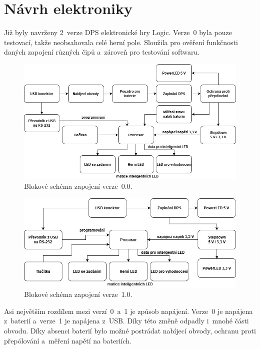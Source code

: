 \chapter{Návrh elektroniky}

Již byly navrženy 2~verze DPS elektronické hry Logic. Verze~0 byla pouze testovací, takže neobsahovala celé herní pole. 
Sloužila pro ověření funkčnosti daných zapojení různých čipů a~zároveň pro testování softwaru.

\begin{figure}[!h]
  \begin{center}
    \includegraphics[scale=0.5]{obrazky/v0_blokove_schema.jpg}
  \end{center}
  \caption[Blokové schéma zapojení verze~0.0]{Blokové schéma zapojení verze~0.0.}
\end{figure}

\begin{figure}[!h]
  \begin{center}
    \includegraphics[scale=0.5]{obrazky/v1_blokove_schema.jpg}
  \end{center}
  \caption[Blokové schéma zapojení verze~1.0]{Blokové schéma zapojení verze~1.0.}
\end{figure}

Asi největším rozdílem mezi verzí~0~a~1 je způsob napájení. Verze~0 je napájena z~baterií a~verze~1 je napájena z~USB. Díky této změně 
odpadly i~mnohé části obvodu. Díky absenci baterií bylo možné postrádat nabíjecí obvody, ochranu proti přepólování a~měření napětí 
na bateriích.

